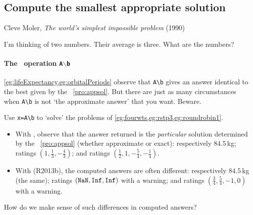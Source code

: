 \subsection{Compute the smallest appropriate solution}
\label{sec:csap}

\begin{quoted}{\parbox[t]{0.5\linewidth}{Cleve Moler, \emph{The world's simplest impossible problem} (1990)}}
I'm thinking of two numbers.  Their average is three.  What are the numbers?
\end{quoted}

\paragraph{The \script\ operation \texttt{A$\backslash$b}}
\cref{eg:lifeExpectancy,eg:orbitalPeriods} observe that \verb|A\b| gives an answer identical to the best  given by the \svd\ \cref{pro:appsol}.
But there are just as many circumstances when \verb|A\b| is not `the approximate answer' that you want.
Beware.

\begin{example} 
Use \verb|x=A\b| to `solve' the problems of \cref{eg:fourwts,eg:rstp3,eg:roundrobin1}.
\begin{itemize}
\item With \script[2], observe that the answer returned is the \emph{particular} solution determined by the \svd\ \cref{pro:appsol} (whether approximate or exact): 
respectively \(84.5\)\,kg; 
ratings \((1,\frac13,-\frac43)\); and 
ratings \((\frac12,1,-\frac54,-\frac14)\). %
\item With \script[1] (R2013b), the computed answers are often different: 
respectively \(84.5\)\,kg (the same); 
ratings \((\verb|NaN|,\verb|Inf|,\verb|Inf|)\) with a warning; 
and ratings \((\tfrac34,\tfrac54,-1,0)\) with a warning. %
\end{itemize}
How do we make sense of such differences in computed answers?
\end{example}

